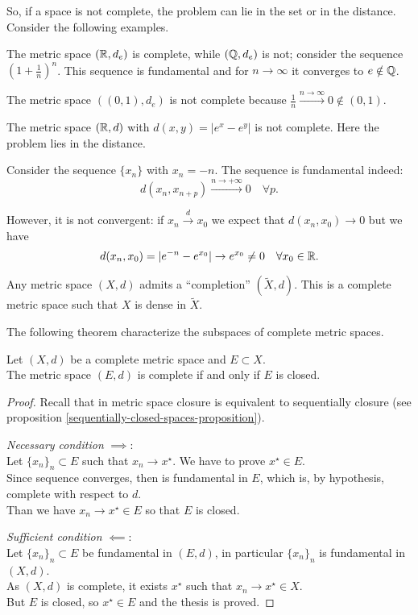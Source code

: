 So, if a space is not complete, the problem can lie in the set or in the distance. Consider the following examples.

\begin{exam}
    The metric space $(\mathbb R, d_e)$ is complete, while $(\mathbb Q,d_e)$ is not; consider the sequence $(1+\frac 1 n)^n$. This sequence is fundamental and for $n \to \infty$ it converges to  $e \notin \mathbb Q$.
    
    The metric space $((0,1), d_e)$ is not complete because $\frac 1 n \xrightarrow{n \to \infty} 0 \notin (0,1)$. 
\end{exam}

\begin{exam}
    The metric space $(\mathbb R, d)$ with $d(x,y)=|e^x-e^y|$ is not complete. 
    Here the problem lies in the distance.
    
    Consider the sequence $\{x_n\}$ with $x_n=-n$.
    The sequence is fundamental indeed:
    $$ d(x_n, x_{n+p}) \xrightarrow{n \to +\infty} 0 \quad \forall p.$$
    
    However, it is not convergent:
    if $x_n \xrightarrow{d} x_0$ we expect that $d(x_n,x_0) \to 0$
    but we have
    $$d(x_n,x_0) = |e^{-n}-e^{x_0}|\to e^{x_0} \neq 0 \quad \forall x_0 \in \mathbb R.$$
\end{exam}


Any metric space $(X,d)$ admits a ``completion'' $(\tilde X, d)$. This is a complete metric space such that $X$ is dense in $\tilde X$.

The following theorem characterize the subspaces of complete metric spaces.

\begin{prop}
    Let $(X,d)$ be a complete metric space and $E\subset X$.\\
    The metric space $(E,d)$ is complete if and only if $E$ is closed.   
\end{prop}
\begin{proof}
	Recall that in metric space closure is equivalent to sequentially closure (see proposition \vref{sequentially-closed-spaces-proposition}).
	
	\textit{Necessary condition} $\implies$:\\
    Let $\{x_n\}_n\subset E$ such that $x_n \to x^\star$. We have to prove $x^\star \in E$.\\
    Since sequence converges, then is fundamental in $E$, which is, by hypothesis, complete with respect to $d$.\\
    Than we have $x_n \to x^\star \in E$ so that $E$ is closed.
    
    \textit{Sufficient condition} $\impliedby$:\\
    Let $\{x_n\}_n \subset E$ be fundamental in $(E, d)$, in particular $\{x_n\}_n$ is fundamental in $(X,d)$.\\
    As $(X,d)$ is complete, it exists $x^\star$ such that $x_n\to x^\star \in X$.\\ 
    But $E$ is closed, so $x^\star \in E$ and the thesis is proved.
\end{proof}

